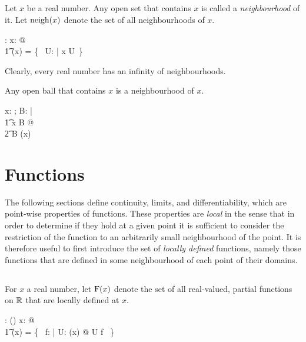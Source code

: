 \documentclass{amsart}
\begin{document}
\subsection{}

Let $x$ be a real number.
Any open set that contains $x$ is called a {\it neighbourhood} of it.
Let $\operatorname{neigh}(x)$ denote the set of all neighbourhoods of $x$.

\begin{axdef}
	\neighR: \R \fun \Fam \R
\where
	\forall x: \R @ \\
	\t1	\neighR(x) = \{~ U: \openR | x \in U~\}
\end{axdef}

Clearly, every real number has an infinity of neighbourhoods.

\begin{remark}
Any open ball that contains $x$ is a neighbourhood of $x$.

\begin{zed}
	\forall x: \R; B: \ballsR | \\
	\t1	x \in B @ \\
	\t2		B \in \neighR(x)
\end{zed}

\end{remark}

\section{Functions}

The following sections define continuity, limits, and differentiability, which are point-wise properties of functions.
These properties are {\it local} in the sense that in order to determine if they hold at a given point it is sufficient to
consider the restriction of the function to an arbitrarily small neighbourhood of the point.
It is therefore useful to first introduce the set of {\it locally defined} functions, 
namely those functions that are defined in some neighbourhood of each point of  their domains.

\subsection{}

For $x$ a real number,
let $\operatorname{F}(x)$ denote the set of all real-valued, partial functions on $\mathbb{R}$ that are locally defined at $x$.

\begin{axdef}
	\FunR: \R \fun \power(\R \pfun \R)
\where
	\forall x: \R @ \\
	\t1	\FunR(x) = \{~ f: \R \pfun \R | \exists U: \neighR(x) @ U \subseteq \dom f ~\}
\end{axdef}
\end{document}
